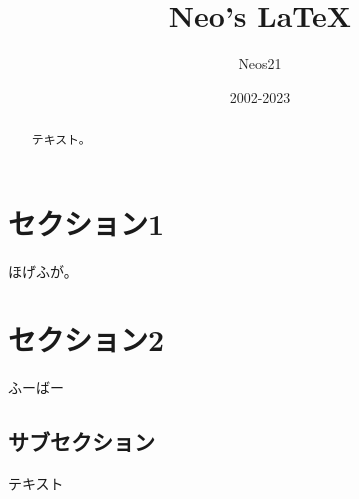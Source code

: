\documentclass{article}
\title{Neo's \LaTeX}
\author{Neos21}
\date{2002-2023}
\begin{document}
  \maketitle

\begin{abstract}
テキスト。
\end{abstract}


\section{セクション1}

ほげふが。

\section{セクション2}

ふーばー

\subsection{サブセクション}

テキスト
\end{document}

